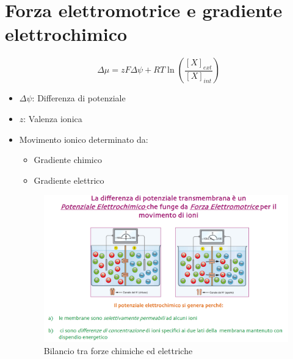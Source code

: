 \documentclass{article}
\begin{document}
\section{Forza elettromotrice e gradiente elettrochimico}
\[
\Delta \mu = zF \Delta \psi + RT \ln\left(\frac{[X]_{ext}}{[X]_{int}}\right)
\]
\begin{itemize}
\item \( \Delta \psi \): Differenza di potenziale
\item \( z \): Valenza ionica
\item Movimento ionico determinato da:
  \begin{itemize}
  \item Gradiente chimico
  \item Gradiente elettrico
  \end{itemize}

\begin{figure}[h]
\centering
\includegraphics[width=1\textwidth]{Neuroscienze 2024-2025/Modulo I/Immagini Modulo I/Screenshot 2025-06-21 at 17-43-48 6. Differenza di potenziale e sua misurazione .pdf.png}
\caption{Bilancio tra forze chimiche ed elettriche}
\label{fig:forza}
\end{figure}
\end{itemize}

\end{document}
